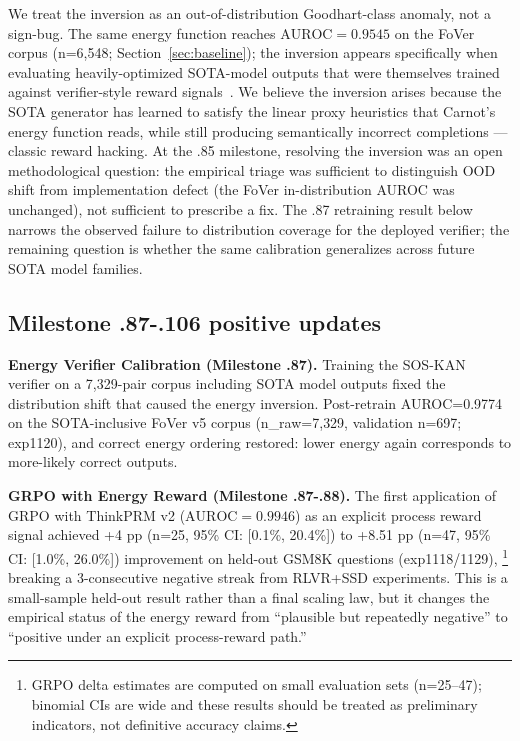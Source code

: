 \documentclass[10pt]{article}
\begin{document}
We treat the inversion as an out-of-distribution Goodhart-class
anomaly, not a sign-bug. The same energy function reaches
$\mathrm{AUROC} = 0.9545$ on the FoVer corpus (n=6{,}548;
Section~\ref{sec:baseline});
the inversion appears specifically when evaluating
heavily-optimized SOTA-model outputs that were themselves trained
against verifier-style reward signals~\cite{rewardunderattack2026,
llmsgamingverifiers2026}. We believe the inversion arises because
the SOTA generator has learned to satisfy the linear proxy
heuristics that Carnot's energy function reads, while still
producing semantically incorrect completions --- classic reward
hacking. At the .85 milestone, resolving the inversion was an open
methodological question: the empirical triage was sufficient to
distinguish OOD shift from implementation defect (the FoVer
in-distribution AUROC was unchanged), not sufficient to prescribe a
fix. The .87 retraining result below narrows the observed failure
to distribution coverage for the deployed verifier; the remaining
question is whether the same calibration generalizes across future
SOTA model families.

\subsection{Milestone .87-.106 positive updates}
\label{sec:positive-updates}

\textbf{Energy Verifier Calibration (Milestone .87).}
Training the SOS-KAN verifier on a 7{,}329-pair corpus including
SOTA model outputs fixed the distribution shift that caused the
energy inversion. Post-retrain AUROC=0.9774 on the SOTA-inclusive
FoVer v5 corpus (n\_raw=7{,}329, validation n=697; exp1120), and
correct energy ordering restored: lower energy again corresponds to
more-likely correct outputs.

\textbf{GRPO with Energy Reward (Milestone .87-.88).}
The first application of GRPO with ThinkPRM v2
($\mathrm{AUROC}=0.9946$) as an explicit process reward signal
achieved +4 pp (n=25, 95\% CI: [0.1\%, 20.4\%]) to +8.51 pp
(n=47, 95\% CI: [1.0\%, 26.0\%]) improvement on held-out GSM8K
questions (exp1118/1129),%
\footnote{GRPO delta estimates are computed on small evaluation sets
(n=25--47); binomial CIs are wide and these results should be treated
as preliminary indicators, not definitive accuracy claims.}
breaking a 3-consecutive negative streak from
RLVR+SSD experiments. This is a small-sample held-out result rather
than a final scaling law, but it changes the empirical status of the
energy reward from ``plausible but repeatedly negative'' to
``positive under an explicit process-reward path.''
\end{document}
